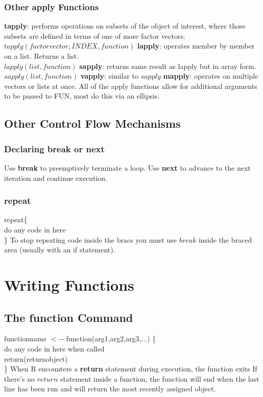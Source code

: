\documentclass[openany]{book}
\begin{document}
\begin{flushleft}
\subsection{Other apply Functions}
\textbf{tapply}: performs operations on subsets of the object of interest, where those subsets are defined in terms of one of more factor vectors. \\
$tapply(factor vector,INDEX,function)$ \medbreak
\textbf{lapply}: operates member by member on a list. Returns a list. \\
$lapply(list,function)$ \medbreak
\textbf{sapply}: returns same result as lapply but in array form. \\
$sapply(list,function)$ \medbreak
\textbf{vapply}: similar to $sapply$ \medbreak
\textbf{mapply}: operates on multiple vectors or lists at once. \medbreak
All of the apply functions allow for additional arguments to be passed to FUN, most do this via an ellipsis.
\section{Other Control Flow Mechanisms}
\subsection{Declaring break or next}
Use \textbf{break} to preemptively terminate a loop. \medbreak
Use \textbf{next} to advance to the next iteration and continue execution.
\subsection{repeat}
repeat\{ \\
\qquad do any code in here\\
\} \medbreak
To stop repeating code inside the bracs you must use $break$ inside the braced area (usually with an if statement).
\chapter{Writing Functions}
\section{The function Command}
functionname $<-$ function(arg1,arg2,arg3,...) \{ \\
\qquad do any code in here when called\\
\qquad return(returnobject)\\
\} \medbreak
When R encounters a \textbf{return} statement during execution, the function exits \medbreak
If there's no $return$ statement inside a function, the function will end when the last line has been run and will return the most recently assigned object. \medbreak

\end{flushleft}
\end{document}
